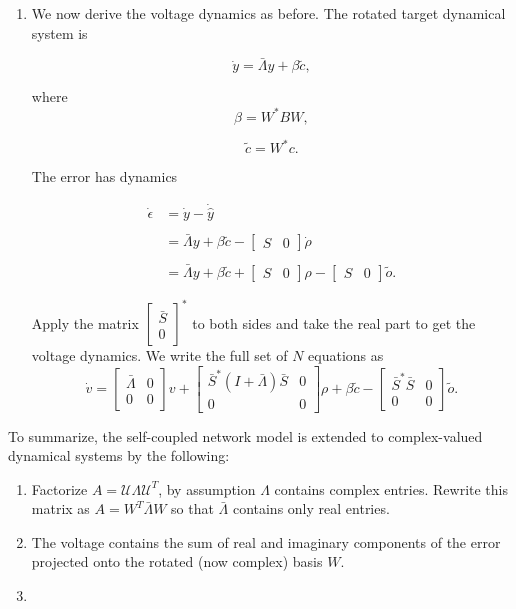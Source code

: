 \begin{enumerate}
\item We now derive the voltage dynamics as before. The rotated target dynamical system is

$$
\dot{y} = \bar{\Lambda} y + \beta \tilde{c},
$$

where 
$$
\beta = W^* B W,
$$

$$
\tilde{c} = W^* c.
$$

The error has dynamics

\begin{align*}
\dot{\epsilon} &= \dot{y} - \dot{\hat{y}}
\\
\\
&=
\bar{\Lambda}y + \beta \tilde{c} - \begin{bmatrix}
S & 0
\end{bmatrix}
\dot{\rho}
\\
\\
&= 
\bar{\Lambda}y + \beta \tilde{c}
+
\begin{bmatrix}
S & 0
\end{bmatrix}
\rho
-
\begin{bmatrix}
S & 0
\end{bmatrix}
\tilde{o}.
\end{align*}


Apply the matrix $\begin{bmatrix}
\bar{S} \\ 0
\end{bmatrix}^*$ to both sides and take the real part to get the voltage dynamics. We write the full set of $N$ equations as
$$
\dot{v} = 
\begin{bmatrix}
\bar{\Lambda} & 0 \\ 0 & 0
\end{bmatrix}
v
+
\begin{bmatrix}
\bar{S}^*\left(I + \bar{\Lambda}\right) \bar{S}  & 0 \\ 0 & 0
\end{bmatrix} \rho 
+
\beta \tilde{c}
-
\begin{bmatrix}
\bar{S}^* \bar{S} &  0 \\ 0 & 0
\end{bmatrix} \tilde{o}.
$$

\end{enumerate}

To summarize, the self-coupled network model is extended to complex-valued dynamical systems by the following:
\begin{enumerate}
	\item Factorize $A = \mathcal{U}\Lambda\mathcal{U}^T$, by assumption $\Lambda$ contains complex entries. Rewrite this matrix as $A = W^T \bar{\Lambda} W$ so that $\bar{\Lambda}$ contains only real entries.
	
	\item The voltage contains the sum of real and imaginary components of the error projected onto the rotated (now complex) basis $W$. 
	
	\item 
\end{enumerate}



